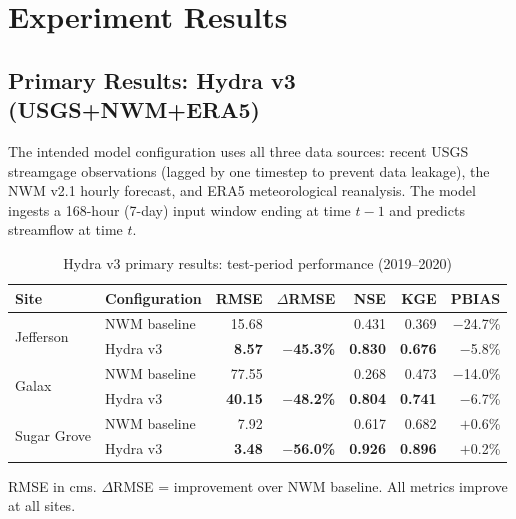 \documentclass[11pt]{article}
\begin{document}
\section{Experiment Results}

\subsection{Primary Results: Hydra v3 (USGS+NWM+ERA5)}

The intended model configuration uses all three data sources: recent USGS streamgage observations (lagged by one timestep to prevent data leakage), the NWM v2.1 hourly forecast, and ERA5 meteorological reanalysis. The model ingests a 168-hour (7-day) input window ending at time $t{-}1$ and predicts streamflow at time $t$.

\begin{table}[h]
\centering
\caption{Hydra v3 primary results: test-period performance (2019--2020)}
\label{tab:primary}
\begin{tabular}{ll rrrrr}
\toprule
\textbf{Site} & \textbf{Configuration} & \textbf{RMSE} & \textbf{$\Delta$RMSE} & \textbf{NSE} & \textbf{KGE} & \textbf{PBIAS} \\
\midrule
\multirow{2}{*}{Jefferson}
  & NWM baseline      & 15.68 &        & 0.431 & 0.369 & $-$24.7\% \\
  & Hydra v3          & \textbf{8.57}  & \textcolor{improved}{$-$\textbf{45.3\%}} & \textbf{0.830} & \textbf{0.676} & $-$5.8\% \\
\midrule
\multirow{2}{*}{Galax}
  & NWM baseline      & 77.55 &        & 0.268 & 0.473 & $-$14.0\% \\
  & Hydra v3          & \textbf{40.15} & \textcolor{improved}{$-$\textbf{48.2\%}} & \textbf{0.804} & \textbf{0.741} & $-$6.7\% \\
\midrule
\multirow{2}{*}{Sugar Grove}
  & NWM baseline      & 7.92  &        & 0.617 & 0.682 & $+$0.6\% \\
  & Hydra v3          & \textbf{3.48}  & \textcolor{improved}{$-$\textbf{56.0\%}} & \textbf{0.926} & \textbf{0.896} & $+$0.2\% \\
\bottomrule
\end{tabular}
\vspace{0.3em}

{\footnotesize RMSE in cms. $\Delta$RMSE = improvement over NWM baseline. All metrics improve at all sites.}
\end{table}
\end{document}
